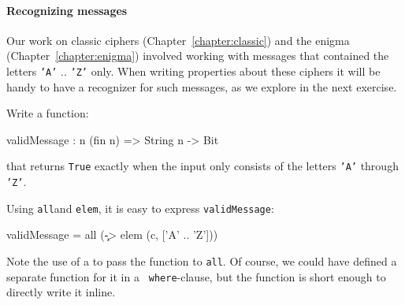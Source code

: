 
\paragraph*{Recognizing messages} Our work on classic ciphers
(Chapter~\ref{chapter:classic}) and the enigma
(Chapter~\ref{chapter:enigma}) involved working with messages that
contained the letters {\tt 'A'} .. {\tt 'Z'} only. When writing
properties about these ciphers it will be handy to have a recognizer
for such messages, as we explore in the next exercise.

\begin{Exercise}\label{ex:cond:2}
Write a function:
\begin{code}
  validMessage : {n} (fin n) => String n -> Bit
\end{code}
that returns {\tt True} exactly when the input only consists of the
letters {\tt 'A'} through {\tt 'Z'}. 
\end{Exercise}

\begin{Answer}
  Using {\tt all}\indAll and {\tt elem}\indElem, it is easy to express
  {\tt validMessage}:
\begin{code}
  validMessage = all (\c -> elem (c, ['A' .. 'Z']))
\end{code}
Note the use of a \lamex to pass the function to {\tt all}. Of course,
we could have defined a separate function for it in a {\tt
  where}-clause\indWhere, but the function is short enough to directly
write it inline.
\end{Answer}


